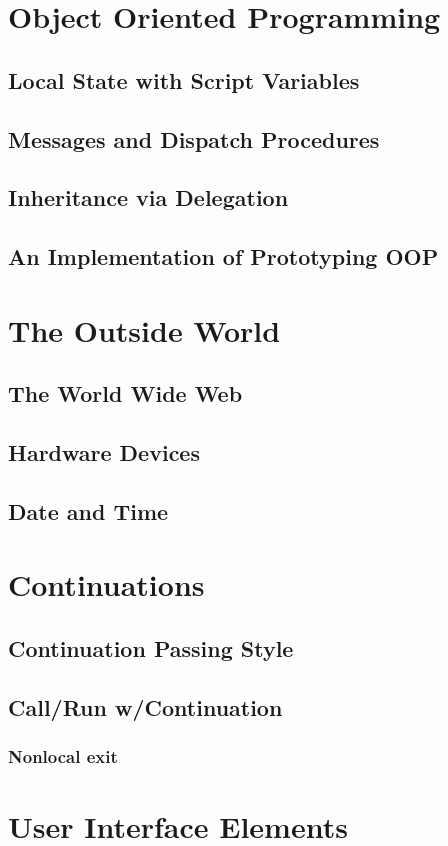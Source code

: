 \documentclass[a4paper]{report}
\begin{document}
\chapter{Object Oriented Programming}
\section{Local State with Script Variables}
\section{Messages and Dispatch Procedures}
\section{Inheritance via Delegation}
\section{An Implementation of Prototyping OOP}
\chapter{The Outside World}
\section{The World Wide Web}
\section{Hardware Devices}
\section{Date and Time}
\chapter{Continuations}
\section{Continuation Passing Style}
\section{Call/Run w/Continuation}
\subsection{Nonlocal exit}
\chapter{User Interface Elements}
\end{document}
